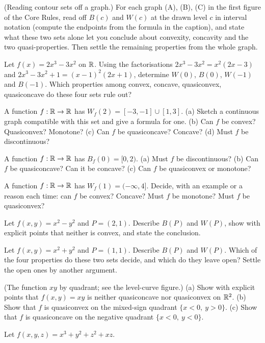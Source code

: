 \begin{problems}
  \item (Reading contour sets off a graph.) For each graph (A), (B), (C) in
        the first figure of the Core Rules, read off $B(c)$ and $W(c)$ at
        the drawn level $c$ in interval notation (compute the endpoints
        from the formula in the caption), and state what these two sets
        alone let you conclude about convexity, concavity and the two
        quasi-properties. Then settle the remaining properties from the
        whole graph.
  \item Let $f(x)=2x^{3}-3x^{2}$ on $\mathbb{R}$. Using the factorisations
        $2x^{3}-3x^{2}=x^{2}(2x-3)$ and $2x^{3}-3x^{2}+1=(x-1)^{2}(2x+1)$,
        determine $W(0)$, $B(0)$, $W(-1)$ and $B(-1)$. Which properties
        among convex, concave, quasiconvex, quasiconcave do these four sets
        rule out?
  \item A function $f:\mathbb{R}\to\mathbb{R}$ has $W_f(2)=[-3,-1]\cup[1,3]$.
        (a) Sketch a continuous graph compatible with this set and give a
        formula for one. (b) Can $f$ be convex? Quasiconvex? Monotone?
        (c) Can $f$ be quasiconcave? Concave? (d) Must $f$ be
        discontinuous?
  \item A function $f:\mathbb{R}\to\mathbb{R}$ has $B_f(0)=[0,2)$.
        (a) Must $f$ be discontinuous? (b) Can $f$ be quasiconcave? Can it
        be concave? (c) Can $f$ be quasiconvex or monotone?
  \item A function $f:\mathbb{R}\to\mathbb{R}$ has $W_f(1)=(-\infty,4]$. Decide, with an
        example or a reason each time: can $f$ be convex? Concave? Must $f$
        be monotone? Must $f$ be quasiconvex?
  \item Let $f(x,y)=x^{2}-y^{2}$ and $P=(2,1)$. Describe $B(P)$ and $W(P)$,
        show with explicit points that neither is convex, and state the
        conclusion.
  \item Let $f(x,y)=x^{2}+y^{2}$ and $P=(1,1)$. Describe $B(P)$ and
        $W(P)$. Which of the four properties do these two sets decide, and
        which do they leave open? Settle the open ones by another argument.
  \item (The function $xy$ by quadrant; see the level-curve figure.)
        (a) Show with explicit points that $f(x,y)=xy$ is neither
        quasiconcave nor quasiconvex on $\mathbb{R}^{2}$.
        (b) Show that $f$ is quasiconvex on the mixed-sign quadrant
        $\{x<0,\ y>0\}$.
        (c) Show that $f$ is quasiconcave on the negative quadrant
        $\{x<0,\ y<0\}$.
  \item Let $f(x,y,z)=x^{3}+y^{2}+z^{2}+xz$.

\end{problems}
